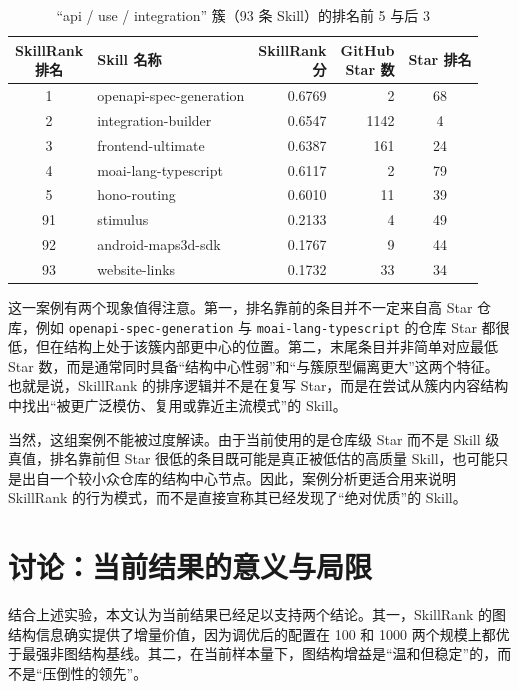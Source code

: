 \begin{table}[htbp]
\centering
\caption{“api / use / integration” 簇（93 条 Skill）的排名前 5 与后 3}
\label{tab:case_study_real}
\small
\begin{tabularx}{\textwidth}{c>{\raggedright\arraybackslash}Xrrc}
\toprule
\makecell[c]{SkillRank\\排名} & Skill 名称 & \makecell[c]{SkillRank\\分} & \makecell[c]{GitHub\\Star 数} & Star 排名 \\
\midrule
1 & openapi-spec-generation & 0.6769 & 2 & 68 \\
2 & integration-builder & 0.6547 & 1142 & 4 \\
3 & frontend-ultimate & 0.6387 & 161 & 24 \\
4 & moai-lang-typescript & 0.6117 & 2 & 79 \\
5 & hono-routing & 0.6010 & 11 & 39 \\
\midrule
91 & stimulus & 0.2133 & 4 & 49 \\
92 & android-maps3d-sdk & 0.1767 & 9 & 44 \\
93 & website-links & 0.1732 & 33 & 34 \\
\bottomrule
\end{tabularx}
\end{table}

这一案例有两个现象值得注意。第一，排名靠前的条目并不一定来自高 Star 仓库，例如 \texttt{openapi-spec-generation} 与 \texttt{moai-lang-typescript} 的仓库 Star 都很低，但在结构上处于该簇内部更中心的位置。第二，末尾条目并非简单对应最低 Star 数，而是通常同时具备“结构中心性弱”和“与簇原型偏离更大”这两个特征。也就是说，SkillRank 的排序逻辑并不是在复写 Star，而是在尝试从簇内内容结构中找出“被更广泛模仿、复用或靠近主流模式”的 Skill。

当然，这组案例不能被过度解读。由于当前使用的是仓库级 Star 而不是 Skill 级真值，排名靠前但 Star 很低的条目既可能是真正被低估的高质量 Skill，也可能只是出自一个较小众仓库的结构中心节点。因此，案例分析更适合用来说明 SkillRank 的行为模式，而不是直接宣称其已经发现了“绝对优质”的 Skill。

\section{讨论：当前结果的意义与局限}
\label{sec:limitations}

结合上述实验，本文认为当前结果已经足以支持两个结论。其一，SkillRank 的图结构信息确实提供了增量价值，因为调优后的配置在 100 和 1000 两个规模上都优于最强非图结构基线。其二，在当前样本量下，图结构增益是“温和但稳定”的，而不是“压倒性的领先”。

